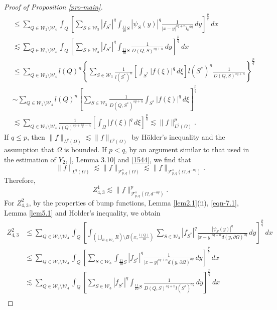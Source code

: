 \documentclass[11pt,twoside]{article}
\def\cf{{\mathcal F}}
\def\cw{\mathcal W}
\def\sxing{S^{*}}
\def\boz{{\Omega}}
\def\pa{\partial}                %
\newcounter{assum}
\theoremstyle{mylem}
\theoremstyle{definition}
\numberwithin{equation}{section}
\begin{document}
\begin{proof}[Proof of Proposition \ref{pro-main}]
\begin{align*}
&\leq \sum_{Q\in \cw_2\setminus\cw_4} \int_{Q} \left[\sum_{S\in\mathcal{W}_3} |f_{\sxing}|^q \int_{\frac{11}{10}S} |\psi_S(y) |^q \frac{1}{|x - y|^{s q + n}{l_0}^{aq}}\,dy \right]^{\frac{p}{q}}\,dx \\
&\lesssim \sum_{Q\in \cw_2\setminus\cw_4} \int_{Q} \left[\sum_{S\in\mathcal{W}_3} |f_{\sxing}|^q \int_{\frac{11}{10}S} \frac{1}{D(Q,S)^{s q + n}}\,dy \right]^{\frac{p}{q}}\,dx \\
&\leq \sum_{Q\in \cw_2\setminus\cw_4} l(Q)^n \left\{\sum_{S\in\mathcal{W}_3} \frac{1}{l(\sxing)^n} \left[\int_{\sxing} |f(\xi)|^q\,d\xi\right] l(\sxing)^n \frac{1}{D(Q,S)^{s q + n}} \right\}^{\frac{p}{q}} \\
&\sim \sum_{Q\in \cw_2\setminus\cw_4} l(Q)^n \left[\sum_{S\in\mathcal{W}_3} \frac{1}{D(Q,\sxing)^{sq+n}} \int_{\sxing}|f(\xi)|^q\,d\xi\right]^{\frac{p}{q}} \\
&\lesssim \sum_{Q\in \cw_2\setminus\cw_4} \frac{1}{l(Q)^{sp+\frac{np}{q}-n}} \left[ \int_{\boz}|f(\xi)|^q \,d\xi\right]^{\frac{p}{q}}
\lesssim \|f\|_{L^q(\boz)}^{p}.
\end{align*}
If $q\leq p$, then $\|f\|_{L^q(\boz)}\lesssim \|f\|_{L^p(\boz)}$ by H\"older's inequality and the assumption that $\boz$ is bounded. If $p<q$, by an argument similar to that used in the estimation of $Y_2$, [\cite{ps2017}, Lemma 3.10] and \eqref{1544}, we find that 
\[
\|f\|_{L^q(\boz)} \lesssim \| f \|_{\cf_{p,q}^{s}(\boz)} \lesssim \| f \|_{\cf_{p,q}^{s}(\boz,d^{-aq})}.
\]
Therefore,
\begin{equation}\label{eqn-3.19}
Z_{4,3}^1 \lesssim  \| f \|_{\cf_{p,q}^{s}(\boz,d^{-aq})}^{p}.
\end{equation}
For $Z_{4,3}^2$, by the properties of bump functions, Lemma \ref{lem2.1}(ii), \eqref{eqn-7.1}, Lemma \ref{lem5.1} and H$\ddot{\text{o}}$lder's inequality, we obtain
\begin{align*}
Z_{4,3}^2 &\leq \sum_{Q\in \cw_2\setminus\cw_4} \int_{Q} \left[ \int_{(\bigcup_{R\in\cw_4}R)\setminus B(x,\frac{l(Q)}{10})} \sum_{S\in\mathcal{W}_3}|f_{\sxing}|^q \frac{|   \psi_S(y)|^q}{|x - y|^{s q + n}d(y,\pa\boz)^{aq}}\,dy \right]^{\frac{p}{q}}\,dx \\
&\leq \sum_{Q\in \cw_2\setminus\cw_4} \int_{Q} \left[\sum_{S\in\mathcal{W}_3} \int_{\frac{11}{10}S} |f_{\sxing}|^q \frac{1}{|x - y|^{s q + n}d(y,\pa\boz)^{aq}}\,dy \right]^{\frac{p}{q}} \,dx \\
&\lesssim \sum_{Q\in \cw_2\setminus\cw_4} \int_{Q} \left[\sum_{S\in\mathcal{W}_3} |f_{\sxing}|^q \int_{\frac{11}{10}S} \frac{1}{D(Q,S)^{s q + n}l(\sxing)^{aq}}\,dy \right]^{\frac{p}{q}}\,dx \\

\end{align*}
\end{proof}
\end{document}
